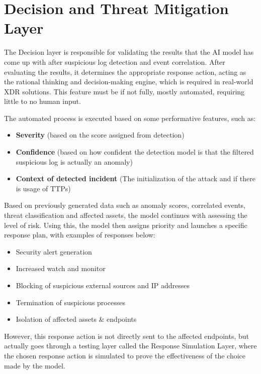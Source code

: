 \documentclass[12pt,a4paper]{report}
\begin{document}
\section{Decision and Threat Mitigation Layer}

The Decision layer is responsible for validating the results that the AI model has come up with
after suspicious log detection and event correlation. After evaluating the results, it determines
the appropriate response action, acting as the rational thinking and decision-making engine, which
is required in real-world XDR solutions. This feature must be if not fully, mostly automated,
requiring little to no human input.

The automated process is executed based on some performative features, such as:

\begin{itemize}
  \item \textbf{Severity} (based on the score assigned from detection)
  \item \textbf{Confidence} (based on how confident the detection model is that the filtered
  suspicious log is actually an anomaly)
  \item \textbf{Context of detected incident} (The initialization of the attack and if there is
  usage of TTPs)
\end{itemize}

Based on previously generated data such as anomaly scores, correlated events, threat
classification and affected assets, the model continues with assessing the level of risk. Using
this, the model then assigns priority and launches a specific response plan, with examples of
responses below:

\begin{itemize}
  \item Security alert generation
  \item Increased watch and monitor
  \item Blocking of suspicious external sources and IP addresses
  \item Termination of suspicious processes
  \item Isolation of affected assets \& endpoints
\end{itemize}

However, this response action is not directly sent to the affected endpoints, but actually goes
through a testing layer called the Response Simulation Layer, where the chosen response action
is simulated to prove the effectiveness of the choice made by the model.
\end{document}
